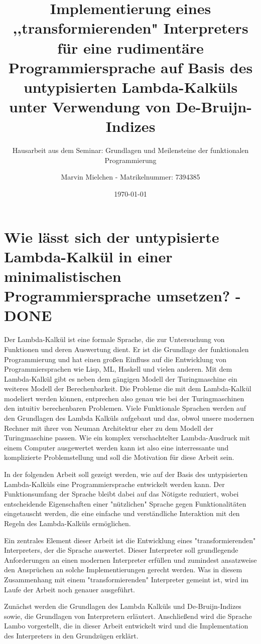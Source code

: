 \documentclass[ngerman]{article}
\title{Implementierung eines ,,transformierenden" Interpreters für eine rudimentäre Programmiersprache auf Basis des untypisierten Lambda-Kalküls unter Verwendung von De-Bruijn-Indizes}
\author{Marvin Mielchen - Matrikelnummer: 7394385}
\subtitle{Hausarbeit aus dem Seminar: Grundlagen und Meilensteine der funktionalen Programmierung}
\date{\today}
\begin{document}
\maketitle


\section{Wie lässt sich der untypisierte Lambda-Kalkül in einer minimalistischen Programmiersprache umsetzen? - DONE}

Der Lambda-Kalkül ist eine formale Sprache, die zur Untersuchung von Funktionen und deren Auswertung dient. Er ist die Grundlage der funktionalen Programmierung und hat einen großen Einfluss auf die Entwicklung von Programmiersprachen wie Lisp, ML, Haskell und vielen anderen.
Mit dem Lambda-Kalkül gibt es neben dem gängigen Modell der Turingmaschine ein weiteres Modell der Berechenbarkeit. 
Die Probleme die mit dem Lambda-Kalkül modeliert werden können, entprechen also genau wie bei der Turingmaschinen den intuitiv berechenbaren Problemen.
Viele Funktionale Sprachen werden auf den Grundlagen des Lambda Kalküls aufgebaut und das, obwol unsere modernen Rechner mit ihrer von Neuman Architektur eher zu dem Modell der Turingmaschine passen.
Wie ein komplex verschachtelter Lambda-Ausdruck mit einem Computer ausgewertet werden kann ist also eine interressante und komplizierte Problemstellung und soll die Motivation für diese Arbeit sein.

In der folgenden Arbeit soll gezeigt werden, wie auf der Basis des untypisierten Lambda-Kalküls eine Programmiersprache entwickelt werden kann. Der Funktionsumfang der Sprache bleibt dabei auf das Nötigste reduziert, wobei entscheidende Eigenschaften einer "nützlichen" Sprache gegen Funktionalitäten eingetauscht werden, die eine einfache und verständliche Interaktion mit den Regeln des Lambda-Kalküls ermöglichen.

Ein zentrales Element dieser Arbeit ist die Entwicklung eines "transformierenden" Interpreters, der die Sprache auswertet. Dieser Interpreter soll grundlegende Anforderungen an einen modernen Interpreter erfüllen und zumindest ansatzweise den Ansprüchen an solche Implementierungen gerecht werden.
Was in diesem Zusammenhang mit einem "transformierenden" Interpreter gemeint ist, wird im Laufe der Arbeit noch genauer ausgeführt.

Zunächst werden die Grundlagen des Lambda Kalküls und De-Bruijn-Indizes sowie, die Grundlagen von Interpretern erläutert. Anschließend wird die Sprache Lambo vorgestellt, die in dieser Arbeit entwickelt wird und die Implementation des Interpreters in den Grundzügen erklärt.
\end{document}
